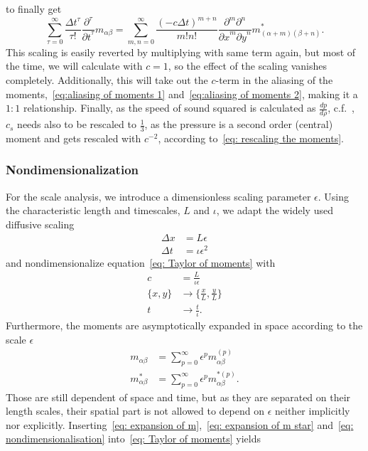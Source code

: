 to finally get
\begin{equation}
  \label{eq: Taylor of moments}
  \sum_{\tau = 0}^\infty \frac{{\Delta t}^\tau }{\tau!} \frac{\partial^\tau}{{\partial t}^\tau} m_{\alpha\beta} =
 \sum_{m,n = 0}^\infty \frac{{(- c\Delta t)}^{m+n}} {m!n!} \frac{\partial^m \partial^n}{ {\partial x}^m{\partial y}^n} m^*_{(\alpha + m)(\beta + n)}.
\end{equation}
This scaling is easily reverted by multiplying with same term again, but most of the time, we will calculate with $c=1$, so the effect of the scaling vanishes completely.
Additionally, this will take out the $c$-term in the aliasing of the moments,~\eqref{eq:aliasing of moments 1} and~\eqref{eq:aliasing of moments 2}, making it a $1:1$ relationship.
Finally, as the speed of sound squared is calculated as $\frac{dp}{d\rho}$, c.f.~\cite[page 175]{wolf2000lattice}, $c_s$ needs also to be rescaled to $\frac{1}{3}$, as the pressure is a second order (central) moment and gets rescaled with $c^{-2}$, according to~\eqref{eq: rescaling the moments}.

\subsubsection{Nondimensionalization}
\label{subs:Nondimensionalization}

For the scale analysis, we introduce a dimensionless scaling parameter $\epsilon$.
Using the characteristic length and timescales, $L$ and $\iota$, we adapt the widely used diffusive scaling
\begin{equation}
  \label{eq: nondimensionalisation}
  \begin{aligned}
    \Delta x & = L\epsilon \\
    \Delta t & = \iota\epsilon^2
  \end{aligned}
\end{equation}
and nondimensionalize equation~\eqref{eq: Taylor of moments} with
\begin{equation}
  \label{eq: nondimensionalisation 2}
  \begin{aligned}
    c & = \frac{L}{\iota\epsilon} \\
    \{x, y\} & \rightarrow \{\frac{x}{L}, \frac{y}{L}\} \\
    t & \rightarrow \frac{t}{\iota}.
  \end{aligned}
\end{equation}
Furthermore, the moments are asymptotically expanded in space according to the scale $\epsilon$
\begin{align}
    \label{eq: expansion of m}
    m_{\alpha\beta} & = \sum_{p=0}^{\infty} \epsilon^p m_{\alpha\beta}^{(p)} \\
    \label{eq: expansion of m star}
    m^*_{\alpha\beta} & = \sum_{p=0}^{\infty} \epsilon^p m_{\alpha\beta}^{*(p)}.
\end{align}
Those are still dependent of space and time, but as they are separated on their length scales, their spatial part is not allowed to depend on $\epsilon$ neither implicitly nor explicitly.
Inserting~\eqref{eq: expansion of m},~\eqref{eq: expansion of m star} and~\eqref{eq: nondimensionalisation} into~\eqref{eq: Taylor of moments} yields

